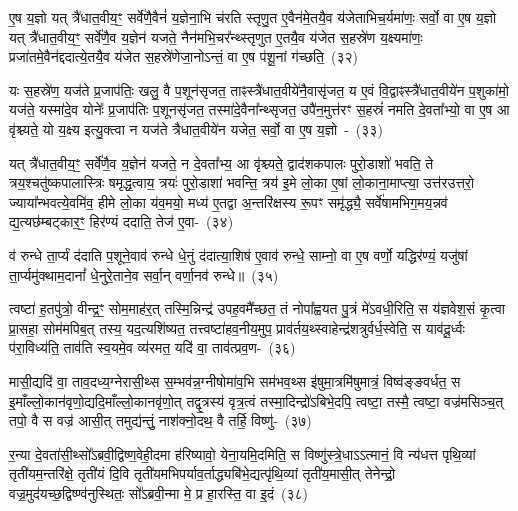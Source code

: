 ए॒ष य॒ज्ञो यत् त्रै॑धात॒वीय॒ꣳ॒ सर्वे॑णै॒वैनं॑ य॒ज्ञेना॒भि च॑रति स्तृणु॒त ए॒वैन॑मे॒तयै॒व य॑जेताभिच॒र्यमा॑णः॒ सर्वो॒ वा ए॒ष य॒ज्ञो यत् त्रै॑धात॒वीय॒ꣳ॒ सर्वे॑णै॒व य॒ज्ञेन॑ यजते॒ नैन॑मभि॒चर᳚न्थ्स्तृणुत ए॒तयै॒व य॑जेत स॒हस्रे॑ण य॒क्ष्यमा॑णः॒ प्रजा॑तमे॒वैन॑द्ददात्ये॒तयै॒व य॑जेत स॒हस्रे॑णेजा॒नो\-ऽन्तं॒ वा ए॒ष प॑शू॒नां ग॑च्छति॒~(३२)\ip

यः स॒हस्रे॑ण॒ यज॑ते प्र॒जा\-प॑तिः॒ खलु॒ वै प॒शून॑सृजत॒ ताꣴस्त्रै॑धात॒वीये॑नै॒वासृ॑जत॒ य ए॒वं वि॒द्वाꣴस्त्रै॑धात॒वीये॑न प॒शुका॑मो॒ यज॑ते॒ यस्मा॑दे॒व योनेः᳚ प्र॒जा\-प॑तिः प॒शूनसृ॑जत॒ तस्मा॑दे॒वैना᳚न्थ्सृजत॒ उपै॑न॒मुत्त॑रꣳ स॒हस्रं॑ नमति दे॒वता᳚भ्यो॒ वा ए॒ष आ वृ॑श्च्यते॒ यो य॒क्ष्य इत्यु॒क्त्वा न यज॑ते त्रैधात॒वीये॑न यजेत॒ सर्वो॒ वा ए॒ष य॒ज्ञो~-~(३३)\ip

यत् त्रै॑धात॒वीय॒ꣳ॒ सर्वे॑णै॒व य॒ज्ञेन॑ यजते॒ न दे॒वता᳚भ्य॒ आ वृ॑श्च्यते॒ द्वाद॑श\-कपालः पुरो॒डाशो॑ भवति॒ ते त्रय॒श्चतु॑ष्कपालास्त्रिः षमृद्ध॒त्वाय॒ त्रयः॑ पुरो॒डाशा॑ भवन्ति॒ त्रय॑ इ॒मे लो॒का ए॒षां लो॒काना॒माप्त्या॒ उत्त॑रउत्तरो॒ ज्याया᳚न्भवत्ये॒वमि॑व॒ हीमे लो॒का य॑व॒मयो॒ मध्य॑ ए॒तद्वा अ॒न्त\-रि॑क्षस्य रू॒पꣳ समृ॑द्ध्यै॒ सर्वे॑षामभिग॒मय॒न्नव॑ द्य॒त्यछ॑म्बट्कार॒ꣳ॒ हिर॑ण्यं ददाति॒ तेज॑ ए॒वा-~(३४)\ip

व॑ रुन्धे ता॒र्प्यं द॑दाति प॒शूने॒वाव॑ रुन्धे धे॒नुं द॑दात्या॒शिष॑ ए॒वाव॑ रुन्धे॒ साम्नो॒ वा ए॒ष वर्णो॒ यद्धिर॑ण्यं॒ यजु॑षां ता॒र्प्यमु॑क्थाम॒दानां᳚ धे॒नुरे॒ताने॒व सर्वा॒न् वर्णा॒नव॑ रुन्धे॥~(३५)\ip

{\anuvakamend[{जग॑त्या\-ऽभि॒चर॒न्थ्सर्वो॒ वै ग॑च्छति य॒ज्ञस्तेज॑ ए॒व त्रि॒ꣳ॒शच्च॑}]}%

त्वष्टा॑ ह॒तपु॑त्रो॒ वीन्द्र॒ꣳ॒ सोम॒माह॑र॒त् तस्मि॒न्निन्द्र॑ उपह॒वमै᳚च्छत॒ तं नोपा᳚ह्वयत पु॒त्रं मे॑\-ऽवधी॒रिति॒ स य॑ज्ञवेश॒सं कृ॒त्वा प्रा॒सहा॒ सोम॑मपिब॒त् तस्य॒ यद॒त्यशि॑ष्यत॒ तत्त्वष्टा॑हव॒नीय॒मुप॒ प्राव॑र्तय॒थ्\-स्वाहेन्द्र॑शत्रुर्वर्ध॒स्वेति॒ स याव॑दू॒र्ध्वः प॑रा॒विध्य॑ति॒ ताव॑ति स्व॒यमे॒व व्य॑रमत॒ यदि॑ वा॒ ताव॑त्प्रव॒ण-~(३६)\ip

मासी॒द्यदि॑ वा॒ ताव॒दध्य॒ग्नेरासी॒थ्स स॒म्भव॑न्न॒ग्नी\-षोमा॑व॒भि सम॑भव॒थ्स इ॑षुमा॒त्रमि॑षुमात्रं॒ विष्व॑ङ्ङवर्धत॒ स इ॒माँल्लो॒कान॑वृणो॒द्य\-दि॒माँल्लो॒कान\-वृ॑णो॒त् तद्वृ॒त्रस्य॑ वृत्र॒त्वं तस्मा॒दिन्द्रो॑\-ऽबिभे॒दपि॒ त्वष्टा॒ तस्मै॒ त्वष्टा॒ वज्र॑मसिञ्च॒त् तपो॒ वै स वज्र॑ आसी॒त् तमुद्य॑न्तुं॒ नाश॑क्नो॒दथ॒ वै तर्\mbox{}हि॒ विष्णु॑-~(३७)\ip

र॒न्या दे॒वता॑सी॒थ्सो᳚\-ऽब्रवी॒द्विष्ण॒वेही॒दमा ह॑रिष्यावो॒ येना॒यमि॒दमिति॒ स विष्णु॑स्त्रे॒धा\-ऽऽ\-त्मानं॒ वि न्य॑धत्त पृथि॒व्यां तृती॑यम॒न्तरि॑क्षे॒ तृती॑यं दि॒वि तृती॑यमभिपर्याव॒र्ताद्ध्यबि॑भे॒द्यत्पृ॑थि॒व्यां तृती॑य॒मासी॒त् तेनेन्द्रो॒ वज्र॒मुद॑यच्छ॒द्विष्ण्व॑नुस्थितः॒ सो᳚\-ऽब्रवी॒न्मा मे॒ प्र हा॒रस्ति॒ वा इ॒दं~(३८)\ip

